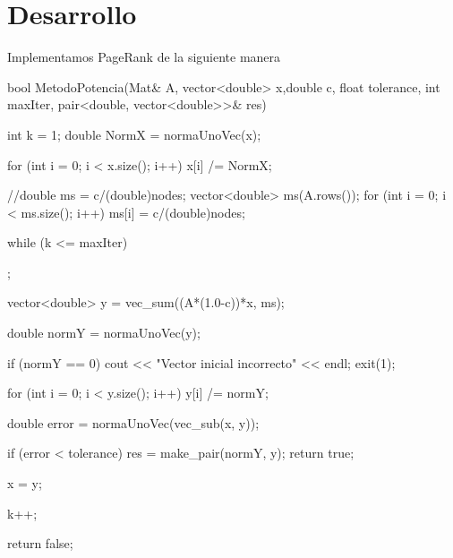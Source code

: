 \section{Desarrollo}

Implementamos PageRank de la siguiente manera

bool MetodoPotencia(Mat& A, vector<double> x,double c, float tolerance, int maxIter, pair<double, vector<double>>& res)
{
	int k = 1;
	double NormX = normaUnoVec(x);

	for (int i = 0; i < x.size(); i++) {
		x[i] /= NormX;
	}

//double ms = c/(double)nodes;
	vector<double> ms(A.rows());
	for (int i = 0; i < ms.size(); i++)
		ms[i] = c/(double)nodes;

	while (k <= maxIter) {		; 
	

		vector<double> y = vec_sum((A*(1.0-c))*x, ms);

		double normY = normaUnoVec(y);			
		
		if (normY == 0) {
			cout << "Vector inicial incorrecto" << endl;
			exit(1);
		}

		for (int i = 0; i < y.size(); i++) {
			y[i] /= normY;
		}
		
		double error = normaUnoVec(vec_sub(x, y));

		if (error < tolerance) {
			res = make_pair(normY, y);
			return true;
		}

		x = y;

		k++;
	}

	return false;
}